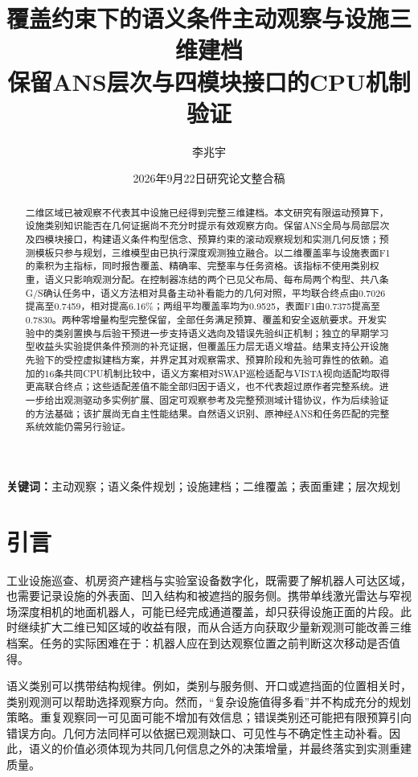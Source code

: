 \documentclass[11pt,a4paper]{article}
\title{\textbf{覆盖约束下的语义条件主动观察与设施三维建档}\\[5pt]
\large 保留ANS层次与四模块接口的CPU机制验证}
\author{李兆宇}
\date{2026年9月22日研究论文整合稿}
\begin{document}
\maketitle
\begin{abstract}
二维区域已被观察不代表其中设施已经得到完整三维建档。本文研究有限运动预算下，设施类别知识能否在几何证据尚不充分时提示有效观察方向。保留ANS全局与局部层次及四模块接口，构建语义条件构型信念、预算约束的滚动观察规划和实测几何反馈；预测模板只参与规划，三维模型由已执行深度观测独立融合。以二维覆盖率与设施表面F1的乘积为主指标，同时报告覆盖、精确率、完整率与任务资格。该指标不使用类别权重，语义只影响观测分配。在控制器冻结的两个已见父布局、每布局两个构型、共八条G/S确认任务中，语义方法相对具备主动补看能力的几何对照，平均联合终点由0.7026提高至0.7459，相对提高6.16\%；两组平均覆盖率均为0.9525，表面F1由0.7375提高至0.7830。两种零增量构型完整保留，全部任务满足预算、覆盖和安全返航要求。开发实验中的类别置换与后验干预进一步支持语义选向及错误先验纠正机制；独立的早期学习型收益头实验提供条件预测的补充证据，但覆盖压力层无语义增益。结果支持公开设施先验下的受控虚拟建档方案，并界定其对观察需求、预算阶段和先验可靠性的依赖。追加的16条共同CPU机制比较中，语义方案相对SWAP巡检适配与VISTA视向适配均取得更高联合终点；这些适配差值不能全部归因于语义，也不代表超过原作者完整系统。进一步给出观测驱动多实例扩展、固定可观察参考及完整预测域计错协议，作为后续验证的方法基础；该扩展尚无自主性能结果。自然语义识别、原神经ANS和任务匹配的完整系统效能仍需另行验证。
\end{abstract}
\noindent\textbf{关键词：}主动观察；语义条件规划；设施建档；二维覆盖；表面重建；层次规划

\section{引言}
工业设施巡查、机房资产建档与实验室设备数字化，既需要了解机器人可达区域，也需要记录设施的外表面、凹入结构和被遮挡的服务侧。携带单线激光雷达与窄视场深度相机的地面机器人，可能已经完成通道覆盖，却只获得设施正面的片段。此时继续扩大二维已知区域的收益有限，而从合适方向获取少量新观测可能改善三维档案。任务的实际困难在于：机器人应在到达观察位置之前判断这次移动是否值得。

语义类别可以携带结构规律。例如，类别与服务侧、开口或遮挡面的位置相关时，类别观测可以帮助选择观察方向。然而，“复杂设施值得多看”并不构成充分的规划策略。重复观察同一可见面可能不增加有效信息；错误类别还可能把有限预算引向错误方向。几何方法同样可以依据已观测缺口、可见性与不确定性主动补看。因此，语义的价值必须体现为共同几何信息之外的决策增量，并最终落实到实测重建质量。
\end{document}
